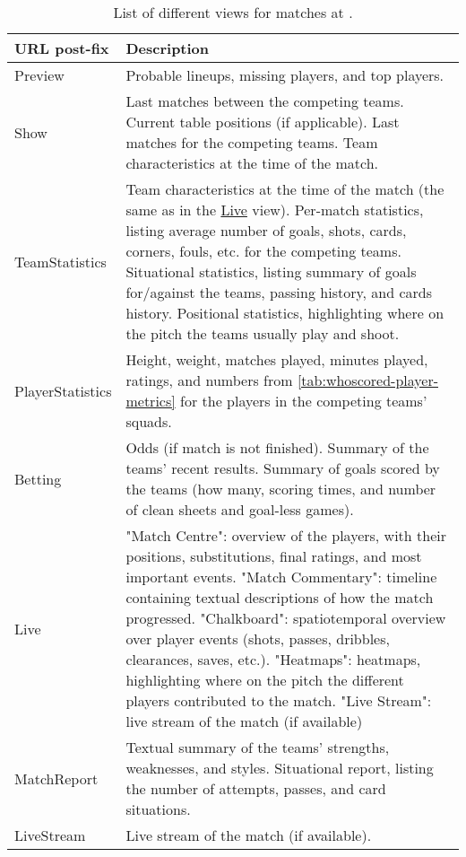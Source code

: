 \begin{table}
    \centering
    \noindent\begin{tabular}{| p{3cm} | p{10cm} |}
        \hline
        \textbf{URL post-fix} & \textbf{Description} \\\hline
        Preview & Probable lineups, missing players, and top players. \\\hline
        Show & Last matches between the competing teams. Current table positions (if applicable). Last matches for the competing teams. Team characteristics at the time of the match. \\\hline
        TeamStatistics & Team characteristics at the time of the match (the same as in the \url{Live} view). Per-match statistics, listing average number of goals, shots, cards, corners, fouls, etc. for the competing teams. Situational statistics, listing summary of goals for/against the teams, passing history, and cards history. Positional statistics, highlighting where on the pitch the teams usually play and shoot. \\\hline
        PlayerStatistics & Height, weight, matches played, minutes played, ratings, and numbers from \cref{tab:whoscored-player-metrics} for the players in the competing teams' squads. \\\hline
        Betting & Odds (if match is not finished). Summary of the teams' recent results. Summary of goals scored by the teams (how many, scoring times, and number of clean sheets and goal-less games). \\\hline
        Live & "Match Centre": overview of the players, with their positions, substitutions, final ratings, and most important events. "Match Commentary": timeline containing textual descriptions of how the match progressed. "Chalkboard": spatiotemporal overview over player events (shots, passes, dribbles, clearances, saves, etc.). "Heatmaps": heatmaps, highlighting where on the pitch the different players contributed to the match. "Live Stream": live stream of the match (if available) \\\hline
        MatchReport & Textual summary of the teams' strengths, weaknesses, and styles. Situational report, listing the number of attempts, passes, and card situations. \\\hline
        LiveStream & Live stream of the match (if available). \\\hline
    \end{tabular}
    \caption{List of different views for matches at \whoscored.}
    \label{tab:whoscored-match-views}
\end{table}

